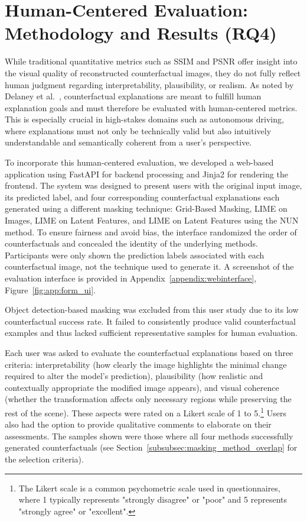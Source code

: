 \section{Human-Centered Evaluation: Methodology and Results (RQ4)} \label{sec:human_evaluation}

While traditional quantitative metrics such as SSIM and PSNR offer insight into the visual quality of reconstructed counterfactual images, they do not fully reflect human judgment regarding interpretability, plausibility, or realism. As noted by Delaney et al.~\cite{DELANEY2023103995}, counterfactual explanations are meant to fulfill human explanation goals and must therefore be evaluated with human-centered metrics. This is especially crucial in high-stakes domains such as autonomous driving, where explanations must not only be technically valid but also intuitively understandable and semantically coherent from a user's perspective.

To incorporate this human-centered evaluation, we developed a web-based application using FastAPI for backend processing and Jinja2 for rendering the frontend. The system was designed to present users with the original input image, its predicted label, and four corresponding counterfactual explanations each generated using a different masking technique: Grid-Based Masking, LIME on Images, LIME on Latent Features, and LIME on Latent Features using the NUN method. To ensure fairness and avoid bias, the interface randomized the order of counterfactuals and concealed the identity of the underlying methods. Participants were only shown the prediction labels associated with each counterfactual image, not the technique used to generate it. A screenshot of the evaluation interface is provided in Appendix~\ref{appendix:webinterface}, Figure~\ref{fig:app:form_ui}.

Object detection-based masking was excluded from this user study due to its low counterfactual success rate. It failed to consistently produce valid counterfactual examples and thus lacked sufficient representative samples for human evaluation.

Each user was asked to evaluate the counterfactual explanations based on three criteria: interpretability (how clearly the image highlights the minimal change required to alter the model’s prediction), plausibility (how realistic and contextually appropriate the modified image appears), and visual coherence (whether the transformation affects only necessary regions while preserving the rest of the scene). These aspects were rated on a Likert scale of 1 to 5.\footnote{The Likert scale is a common psychometric scale used in questionnaires, where 1 typically represents "strongly disagree" or "poor" and 5 represents "strongly agree" or "excellent".} Users also had the option to provide qualitative comments to elaborate on their assessments. The samples shown were those where all four methods successfully generated counterfactuals (see Section~\ref{subsubsec:masking_method_overlap} for the selection criteria).

